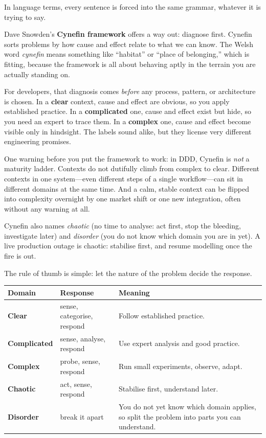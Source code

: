 \documentclass[10pt,a4paper]{article}
\begin{document}
In language terms, every sentence is forced into the same grammar, whatever it is trying to say.

Dave Snowden's \textbf{Cynefin framework} \cite{snowden07} offers a way out: diagnose first. Cynefin sorts problems by how cause and effect relate to what we can know. The Welsh word \emph{cynefin} means something like “habitat” or “place of belonging,” which is fitting, because the framework is all about behaving aptly in the terrain you are actually standing on.

For developers, that diagnosis comes \emph{before} any process, pattern, or architecture is chosen. In a \textbf{clear} context, cause and effect are obvious, so you apply established practice. In a \textbf{complicated} one, cause and effect exist but hide, so you need an expert to trace them. In a \textbf{complex} one, cause and effect become visible only in hindsight. The labels sound alike, but they license very different engineering promises.

One warning before you put the framework to work: in DDD, Cynefin is \emph{not} a maturity ladder. Contexts do not dutifully climb from complex to clear. Different contexts in one system—even different steps of a single workflow—can sit in different domains at the same time. And a calm, stable context can be flipped into complexity overnight by one market shift or one new integration, often without any warning at all.

\begin{aside}
Cynefin also names \emph{chaotic} (no time to analyse: act first, stop the bleeding, investigate later) and \emph{disorder} (you do not know which domain you are in yet). A live production outage is chaotic: stabilise first, and resume modelling once the fire is out.
\end{aside}

The rule of thumb is simple: let the nature of the problem decide the response.

\begin{center}
\small\renewcommand{\arraystretch}{1.4}
\begin{tabularx}{\linewidth}{@{}>{\raggedright\sffamily\bfseries}p{27mm}>{\ttfamily\footnotesize}p{34mm}X@{}}
\toprule
\textbf{Domain} & \sffamily\textbf{Response} & \sffamily\textbf{Meaning} \\ \midrule
Clear & sense, categorise, respond & Follow established practice. \\ \midrule
Complicated & sense, analyse, respond & Use expert analysis and good practice. \\ \midrule
Complex & probe, sense, respond & Run small experiments, observe, adapt. \\ \midrule
Chaotic & act, sense, respond & Stabilise first, understand later. \\ \midrule
Disorder & break it apart & You do not yet know which domain applies, so split the problem into parts you can understand. \\
\bottomrule
\end{tabularx}
\end{center}
\end{document}
